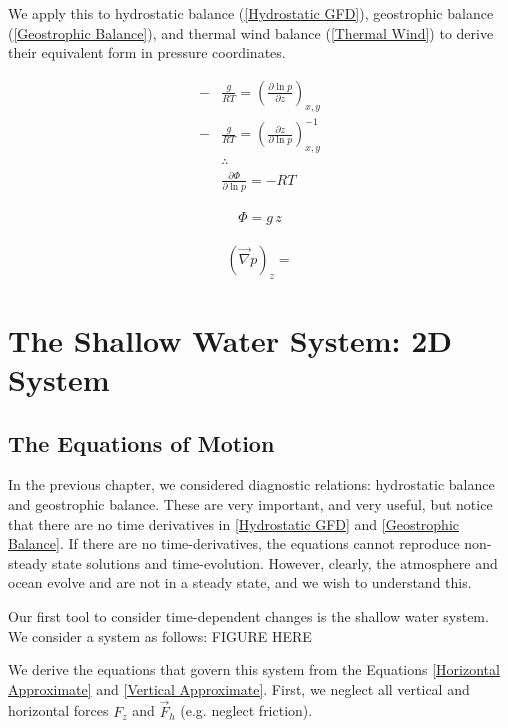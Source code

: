 We apply this to hydrostatic balance (\ref{Hydrostatic GFD}), geostrophic balance (\ref{Geostrophic Balance}), and thermal wind balance (\ref{Thermal Wind}) to derive their equivalent form in pressure coordinates.

\begin{align}
    -&\frac{g}{RT}=\left(\frac{\partial \ln p}{\partial z}\right)_{x,y}\nonumber\\
    -&\frac{g}{RT}=\left(\frac{\partial z}{\partial \ln p}\right)_{x,y}^{-1}\nonumber\\
    &\therefore\nonumber
    \\
    &\boxed{\frac{\partial \Phi}{\partial \ln p}=-RT}\label{Hydrostatic Pressure}
\end{align}

\begin{align}
    \boxed{\Phi =g\,z}
\end{align}

\begin{align}
    \left(\vec{\nabla}p\right)_z=
\end{align}



\chapter{The Shallow Water System: 2D System}\label{Shallow Water System}

\section{The Equations of Motion}

In the previous chapter, we considered diagnostic relations: hydrostatic balance and geostrophic balance. These are very important, and very useful, but notice that there are no time derivatives in \ref{Hydrostatic GFD} and \ref{Geostrophic Balance}. If there are no time-derivatives, the equations cannot reproduce non-steady state solutions and time-evolution. However, clearly, the atmosphere and ocean evolve and are not in a steady state, and we wish to understand this.

Our first tool to consider time-dependent changes is the shallow water system. We consider a system as follows: FIGURE HERE

We derive the equations that govern this system from the Equations \ref{Horizontal Approximate} and \ref{Vertical Approximate}. First, we neglect all vertical and horizontal forces $F_z$ and $\vec{F}_h$ (e.g. neglect friction).

